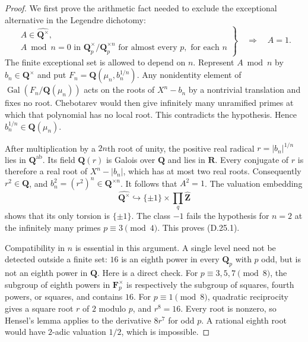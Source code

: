 \begin{proof}
We first prove the arithmetic fact needed to exclude the
exceptional alternative in the Legendre dichotomy:
\[
 \left.
 \begin{gathered}
 A\in\widehat{\mathbf Q^\times},\\
 A\bmod n=0\text{ in }\mathbf Q_p^\times/
       \mathbf Q_p^{\times n}
       \text{ for almost every }p,\text{ for each }n
 \end{gathered}
 \right\}
 \quad\Longrightarrow\quad A=1.
 \tag{D.25.1}
\]
The finite exceptional set is allowed to depend on $n$.
Represent $A\bmod n$ by $b_n\in\mathbf Q^\times$ and put
$F_n=\mathbf Q(\mu_n,b_n^{1/n})$.  Any nonidentity element of
$\operatorname{Gal}(F_n/\mathbf Q(\mu_n))$ acts on the roots of
$X^n-b_n$ by a nontrivial translation and fixes no root.
Chebotarev would then give infinitely many unramified primes at
which that polynomial has no local root.  This contradicts the
hypothesis.  Hence $b_n^{1/n}\in\mathbf Q(\mu_n)$.

After multiplication by a $2n$th root of unity, the positive real
radical $r=|b_n|^{1/n}$ lies in $\mathbf Q^{\mathrm{ab}}$.
Its field $\mathbf Q(r)$ is Galois over $\mathbf Q$ and lies in
$\mathbf R$.  Every conjugate of $r$ is therefore a real root of
$X^n-|b_n|$, which has at most two real roots.  Consequently
$r^2\in\mathbf Q$, and
$b_n^2=(r^2)^n\in\mathbf Q^{\times n}$.  It follows that $A^2=1$.
The valuation embedding
\[
 \widehat{\mathbf Q^\times}\hookrightarrow
 \{\pm1\}\times\prod_q\widehat{\mathbf Z}
\]
shows that its only torsion is $\{\pm1\}$.  The class $-1$
fails the hypothesis for $n=2$ at the infinitely many primes
$p\equiv3\pmod4$.  This proves (D.25.1).

Compatibility in $n$ is essential in this argument.  A single
level need not be detected outside a finite set: $16$ is an
eighth power in every $\mathbf Q_p$ with $p$ odd, but is not
an eighth power in $\mathbf Q$.  Here is a direct check.  For
$p\equiv3,5,7\pmod8$, the subgroup of eighth powers in
$\mathbf F_p^\times$ is respectively the subgroup of squares,
fourth powers, or squares, and contains $16$.  For
$p\equiv1\pmod8$, quadratic reciprocity gives a square root
$r$ of $2$ modulo $p$, and $r^8=16$.  Every root is nonzero,
so Hensel's lemma applies to the derivative $8r^7$ for odd
$p$.  A rational eighth root would have $2$-adic valuation
$1/2$, which is impossible.


\end{proof}
